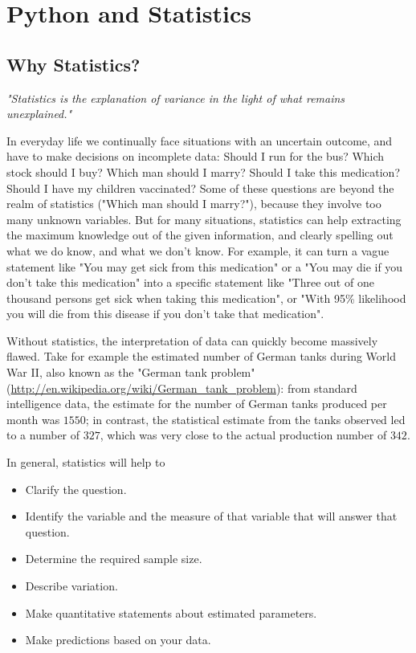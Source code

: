 \part{Python and Statistics}

\chapter{Why Statistics?}

\emph{"Statistics is the explanation of variance in the light of what remains
unexplained."}

\vspace{5 mm}

In everyday life we continually face situations with an uncertain outcome, and have to make decisions on incomplete data: Should I run for the bus? Which stock should I buy? Which man should I marry? Should I take this medication? Should I have my children vaccinated? Some of these questions are beyond the realm of statistics ("Which man should I marry?"), because they involve too many unknown variables. But for many situations, statistics can help extracting the maximum knowledge out of the given information, and clearly spelling out what we do know, and what we don't know. For example, it can turn a vague statement like "You may get sick from this medication" or a  "You may die if you don't take this medication" into a specific statement like "Three out of one thousand persons get sick when taking this medication", or "With 95\% likelihood you will die from this disease if you don't take that medication".

Without statistics, the interpretation of data can quickly become massively flawed. Take for example the estimated number of German tanks during World War II, also known as the "German tank problem" (\url{http://en.wikipedia.org/wiki/German\_tank\_problem}): from standard intelligence data, the estimate for the number of German tanks produced per month was $1550$; in contrast, the statistical estimate from the tanks observed led to a number of $327$, which was very close to the actual production number of $342$.

In general, statistics will help to
\begin{itemize}
  \item Clarify the question.
  \item Identify the variable and the measure of that variable that will answer that question.
  \item Determine the required sample size.
  \item Describe variation.
  \item Make quantitative statements about estimated parameters.
  \item Make predictions based on your data.
\end{itemize}

